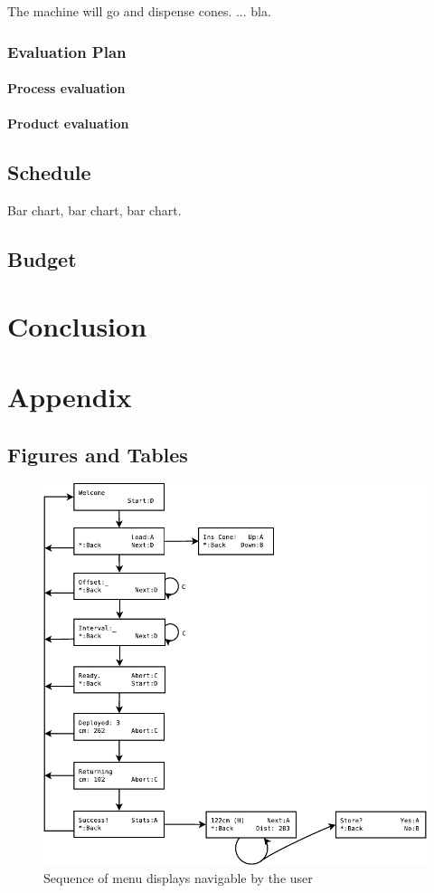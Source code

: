 \documentclass[11pt]{report}
\begin{document}
The machine will go and dispense cones. ... bla.



\subsection{Evaluation Plan}
\subsubsection{Process evaluation}

\subsubsection{Product evaluation}


\section{Schedule}
Bar chart, bar chart, bar chart.

\section{Budget}


\chapter{Conclusion}


\appendix
\chapter{Appendix}
\section{Figures and Tables}
\begin{figure}
  \centering
  \includegraphics{menu_flowchart.pdf}
  \caption{Sequence of menu displays navigable by the user}
  \label{fig:menuflow}
\end{figure}

%
\end{document}

